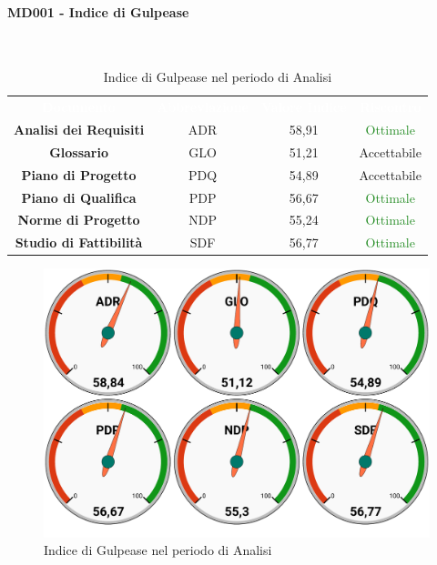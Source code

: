 \paragraph{MD001 - Indice di Gulpease}\mbox{}\\[0,3cm]
\begin{table}[H]
	\centering
	\begin{tabular}{cccc}
	\rowcolor{greySWEight}
	\textcolor{white}{\textbf{Documento}} & 
	\textcolor{white}{\textbf{Abbreviazione}} &
	\textcolor{white}{\textbf{Valore Indice}}&
	\textcolor{white}{\textbf{Riscontro}}\\
	
	\textbf{Analisi dei Requisiti} & ADR & 58,91 & \textcolor{ForestGreen}{Ottimale} \\
	\textbf{Glossario} & GLO & 51,21 & \textcolor{YellowOrange}{Accettabile} \\
	\textbf{Piano di Progetto} & PDQ & 54,89 & \textcolor{YellowOrange}{Accettabile} \\
	\textbf{Piano di Qualifica} & PDP & 56,67 & \textcolor{ForestGreen}{Ottimale} \\
	\textbf{Norme di Progetto} & NDP & 55,24 & \textcolor{ForestGreen}{Ottimale} \\
	\textbf{Studio di Fattibilità} & SDF & 56,77 & \textcolor{ForestGreen}{Ottimale} \\

	\end{tabular}
	\caption{Indice di Gulpease nel periodo di Analisi}
\end{table}
\begin{figure}[H]
	\includegraphics[width=1\linewidth]{sez/App_Esito/Analisi/graph/AN_Gulp.pdf}
	\caption{Indice di Gulpease nel periodo di Analisi}
\end{figure}

